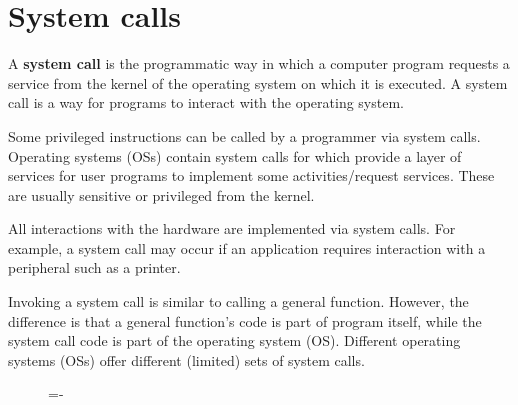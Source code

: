 \documentclass[a4paper]{systems-software}
\begin{document}
\section*{System calls}

A \textbf{system call} is the programmatic way in which a computer program requests a service from the kernel of the operating system on which it is executed. A system call is a way for programs to interact with the operating system.

Some privileged instructions can be called by a programmer via system calls. Operating systems (OSs) contain system calls for which provide a layer of services for user programs to implement some activities/request services. These are usually sensitive or privileged from the kernel.

All interactions with the hardware are implemented via system calls. For example, a system call may occur if an application requires interaction with a peripheral such as a printer.

Invoking a system call is similar to calling a general function. However, the difference is that a general function’s code is part of program itself, while the system call code is part of the operating system (OS). Different operating systems (OSs) offer different (limited) sets of system calls.

\begin{figure}[H]
  \lineskip=-\fboxrule
\end{figure}
\end{document}
